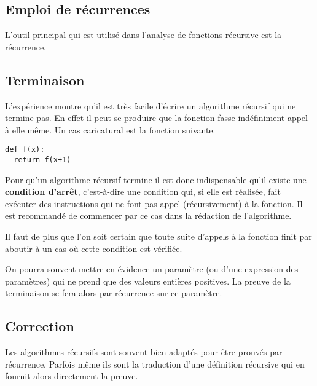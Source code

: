 \subsection{Emploi de récurrences}
L'outil principal qui est utilisé dans l'analyse de fonctions récursive est la récurrence.
\subsection{Terminaison}
 L'expérience montre qu'il est très facile d'écrire un algorithme récursif qui ne termine pas. En effet il peut se produire que la fonction fasse indéfiniment appel à elle même. Un cas caricatural est la fonction suivante.
\begin{lstlisting}
def f(x):
  return f(x+1)
\end{lstlisting}
Pour qu'un algorithme récursif termine il est donc indispensable qu'il existe une {\bf condition d'arrêt}, c'est-à-dire une condition qui, si elle est réalisée, fait exécuter des instructions qui ne font pas appel (récursivement) à la fonction. Il est recommandé de commencer par ce cas dans la rédaction de l'algorithme.

Il faut de plus que l'on soit certain que toute suite d'appels à la fonction finit par aboutir à un cas où cette condition est vérifiée.

On pourra souvent mettre en évidence un paramètre (ou d'une expression des paramètres) qui ne prend que des valeurs entières positives. La preuve de la terminaison se fera alors par récurrence sur ce paramètre. 
\subsection{Correction}

Les algorithmes récursifs sont souvent bien adaptés pour être prouvés par récurrence. Parfois même ils sont la traduction d'une définition récursive qui en fournit alors directement la preuve.
